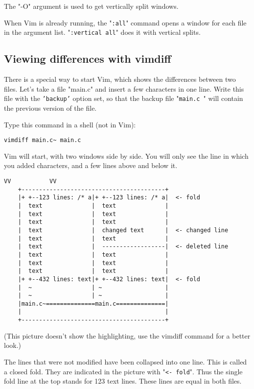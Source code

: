 The "-O" argument is used to get vertically split windows.

When Vim is already running, the "\texttt{:all}" command opens a window for each file in the argument list.  "\texttt{:vertical all}" does it with vertical splits.

\subsection{Viewing differences with vimdiff}
\label{Viewing differences with vimdiff}

There is a special way to start Vim, which shows the differences between two files.
Let's take a file "main.c" and insert a few characters in one line.
Write this file with the \texttt{'backup'} option set, so that the backup file "\texttt{main.c~}" will contain the previous version of the file.

Type this command in a shell (not in Vim):

 \begin{Verbatim}[samepage=true]
 vimdiff main.c~ main.c
 \end{Verbatim}

Vim will start, with two windows side by side.
You will only see the line in which you added characters, and a few lines above and below it.

\begin{Verbatim}[samepage=true]
     VV           VV
    +-----------------------------------------+
    |+ +--123 lines: /* a|+ +--123 lines: /* a|  <- fold
    |  text              |  text              |
    |  text              |  text              |
    |  text              |  text              |
    |  text              |  changed text      |  <- changed line
    |  text              |  text              |
    |  text              |  ------------------|  <- deleted line
    |  text              |  text              |
    |  text              |  text              |
    |  text              |  text              |
    |+ +--432 lines: text|+ +--432 lines: text|  <- fold
    |  ~                 | ~                  |
    |  ~                 | ~                  |
    |main.c~==============main.c==============|
    |                                         |
    +-----------------------------------------+
\end{Verbatim}

(This picture doesn't show the highlighting, use the vimdiff command for a better look.)

The lines that were not modified have been collapsed into one line.
This is called a closed fold.
They are indicated in the picture with "\texttt{<- fold}".
Thus the single fold line at the top stands for 123 text lines.
These lines are equal in both files.

